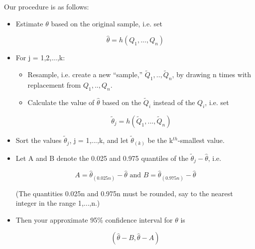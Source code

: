 Our procedure is as follows:

\begin{itemize}

\item Estimate $\theta$ based on the original sample, i.e. set

\begin{equation}
\widehat{\theta} = h(Q_1,...,Q_n)
\end{equation}

\item For j = 1,2,...,k:

   \begin{itemize}

   \item Resample, i.e. create a new ``sample,'' $\widetilde{Q}_1,..,
   \widetilde{Q}_n$, by drawing n times with replacement from
   $Q_1,..,Q_n$.

   \item Calculate the value of $\widehat{\theta}$ based on the
   $\widetilde{Q}_i$ instead of the $Q_i$, i.e. set

   \begin{equation}
   \widetilde{\theta}_j = h(\widetilde{Q}_1,...,\widetilde{Q}_n)
   \end{equation}

   \end{itemize}

\item Sort the values $\widetilde{\theta}_j$, j = 1,...,k, and let
$\widetilde{\theta}_{(k)}$ be the k$^{th}$-smallest value.

\item Let A and B denote the 0.025 and 0.975 quantiles of the
$\widetilde{\theta}_j - \widehat{\theta}$, i.e. 

\begin{equation}
\label{abci}
A = \widehat{\theta}_{(0.025n)} - \widehat{\theta} \textrm{ and }
B = \widehat{\theta}_{(0.975n)} - \widehat{\theta}
\end{equation}

(The quantities 0.025n and 0.975n must be rounded, say to the nearest
integer in the range 1,...,n.) 

\item Then your approximate 95\% confidence interval for $\theta$ is 

\begin{equation}
\label{bootci}
(\widehat{\theta} - B, \widehat{\theta} - A)
\end{equation}

\end{itemize}

